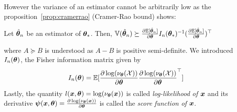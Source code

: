 However the variance of an estimator cannot be arbitrarily low as the
proposition~\ref{prop:cramerrao} (Cramer-Rao bound) shows:
\begin{proposition}
  \label{prop:cramerrao}
  Let $\hat{\boldsymbol{\theta}}_n$ be an estimator of $\boldsymbol{\theta}_*$.
  Then, $\mathbb{V}(\hat{\boldsymbol{\theta}}_n) \succeq
  \frac{ \partial \mathbb{E}[\hat{\boldsymbol{\theta}}_n]}{\partial \boldsymbol{\theta}}I_n(\boldsymbol{\theta}_*)^{-1} (\frac{ \partial \mathbb{E}[\hat{\boldsymbol{\theta}}_n]}{\partial \boldsymbol{\theta}})^{\top}$
\end{proposition}
where $A \succeq B$ is understood as $A-B$ is positive semi-definite.
We introduced $I_n(\boldsymbol{\theta})$, the Fisher information matrix given by
\begin{align}
  I_n(\boldsymbol{\theta}) = \mathbb{E}[\frac{ \partial \log(\nu_{\boldsymbol{\theta}}(\mathcal{X}))}{\partial \boldsymbol{\theta}} \frac{ \partial \log(\nu_{\boldsymbol{\theta}}(\mathcal{X}))}{\partial \boldsymbol{\theta}}^{\top}]
\end{align}
Lastly, the quantity $l(\boldsymbol{x}, \boldsymbol{\theta}) = \log(\nu_{\boldsymbol{\theta}}(\boldsymbol{x}))$ is called
\emph{log-likelihood of $\boldsymbol{x}$} and its derivative $\boldsymbol{\psi}(\boldsymbol{x}, \boldsymbol{\theta}) =
\frac{ \partial \log(\nu_{\boldsymbol{\theta}}(\boldsymbol{x}))}{\partial \boldsymbol{\theta}}$ is called the \emph{score
  function of $\boldsymbol{x}$}. 
